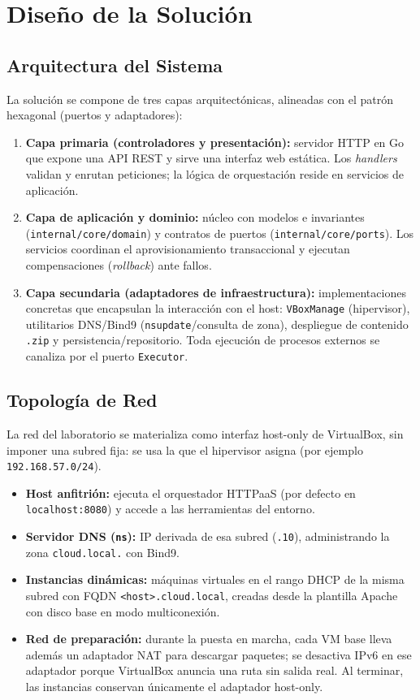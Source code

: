 \section{Diseño de la Solución}

\subsection{Arquitectura del Sistema}
La solución se compone de tres capas arquitectónicas, alineadas con el patrón hexagonal (puertos y adaptadores):
\begin{enumerate}
    \item \textbf{Capa primaria (controladores y presentación):} servidor HTTP en Go que expone una API REST y sirve una interfaz web estática. Los \textit{handlers} validan y enrutan peticiones; la lógica de orquestación reside en servicios de aplicación.
    \item \textbf{Capa de aplicación y dominio:} núcleo con modelos e invariantes (\texttt{internal/core/domain}) y contratos de puertos (\texttt{internal/core/ports}). Los servicios coordinan el aprovisionamiento transaccional y ejecutan compensaciones (\textit{rollback}) ante fallos.
    \item \textbf{Capa secundaria (adaptadores de infraestructura):} implementaciones concretas que encapsulan la interacción con el host: \texttt{VBoxManage} (hipervisor), utilitarios DNS/Bind9 (\texttt{nsupdate}/consulta de zona), despliegue de contenido \texttt{.zip} y persistencia/repositorio. Toda ejecución de procesos externos se canaliza por el puerto \texttt{Executor}.
\end{enumerate}

\subsection{Topología de Red}
La red del laboratorio se materializa como interfaz host-only de VirtualBox, sin imponer una subred fija: se usa la que el hipervisor asigna (por ejemplo \texttt{192.168.57.0/24}).
\begin{itemize}
    \item \textbf{Host anfitrión:} ejecuta el orquestador HTTPaaS (por defecto en \texttt{localhost:8080}) y accede a las herramientas del entorno.
    \item \textbf{Servidor DNS (\texttt{ns}):} IP derivada de esa subred (\texttt{.10}), administrando la zona \texttt{cloud.local.} con Bind9.
    \item \textbf{Instancias dinámicas:} máquinas virtuales en el rango DHCP de la misma subred con FQDN \texttt{<host>.cloud.local}, creadas desde la plantilla Apache con disco base en modo multiconexión.
    \item \textbf{Red de preparación:} durante la puesta en marcha, cada VM base lleva además un adaptador NAT para descargar paquetes; se desactiva IPv6 en ese adaptador porque VirtualBox anuncia una ruta sin salida real. Al terminar, las instancias conservan únicamente el adaptador host-only.
\end{itemize}

